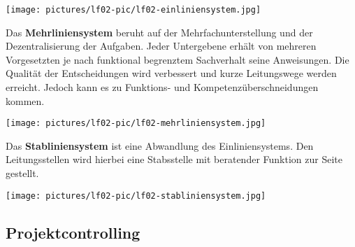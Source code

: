 \texttt{[image: pictures/lf02-pic/lf02-einliniensystem.jpg]}

Das \textbf{Mehrliniensystem} beruht auf der Mehrfachunterstellung und der Dezentralisierung der Aufgaben. Jeder Untergebene erhält von mehreren Vorgesetzten je nach funktional begrenztem Sachverhalt seine Anweisungen. Die Qualität der Entscheidungen wird verbessert und kurze Leitungswege werden erreicht. Jedoch kann es zu Funktions- und Kompetenzüberschneidungen kommen.
 
\texttt{[image: pictures/lf02-pic/lf02-mehrliniensystem.jpg]}

Das \textbf{Stabliniensystem} ist eine Abwandlung des Einliniensystems. Den Leitungsstellen wird hierbei eine Stabsstelle mit beratender Funktion zur Seite gestellt.

\texttt{[image: pictures/lf02-pic/lf02-stabliniensystem.jpg]}


\subsection{Projektcontrolling}

